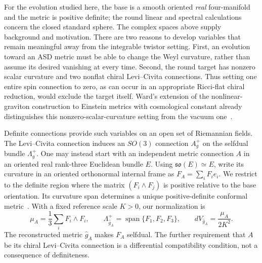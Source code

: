 \documentclass[11pt]{article}
\numberwithin{equation}{section}
\theoremstyle{definition}
\theoremstyle{remark}
\begin{document}
For the evolution studied here, the base is a smooth oriented \emph{real}
four-manifold and the metric is positive definite; the round linear and
spectral calculations concern the closed standard sphere. The complex spaces
above supply background and motivation. There are two reasons to develop
variables that remain meaningful away from the integrable twistor setting.
First, an evolution toward an ASD metric must be able to change the Weyl
curvature, rather than assume its desired vanishing at every time. Second,
the round target has nonzero scalar curvature and two nonflat chiral
Levi--Civita connections. Thus setting one entire spin connection to zero,
as can occur in an appropriate Ricci-flat chiral reduction, would exclude
the target itself. Ward's extension of the nonlinear-graviton construction
to Einstein metrics with cosmological constant already distinguishes this
nonzero-scalar-curvature setting from the vacuum one~\cite{Ward1980}.

Definite connections provide such variables on an open set of Riemannian
fields. The Levi--Civita connection induces an \(SO(3)\) connection
\(A_g^+\) on the selfdual bundle \(\Lambda_g^+\).
One may instead start with an independent metric connection \(A\) in an
oriented real rank-three Euclidean bundle \(E\). Using
\(\mathfrak{so}(E)\simeq E\), write its curvature in an oriented
orthonormal internal frame as \(F_A=\sum_iF_i e_i\). We restrict to the
definite region where the matrix \((F_i\wedge F_j)\) is positive relative
to the base orientation. Its curvature span determines a unique
positive-definite conformal metric~\cite{Fine2011}.
With a fixed reference scale \(K>0\), our normalization is
\begin{equation}\label{eq:intro-reconstruction}
 \mu_A=\frac13\sum_iF_i\wedge F_i,\qquad
 \Lambda^+_{\widehat g_A}=\operatorname{span}\{F_1,F_2,F_3\},\qquad
 dV_{\widehat g_A}=\frac{\mu_A}{2K^2}.
\end{equation}
The reconstructed metric \(\widehat g_A\) makes \(F_A\) selfdual.
The further requirement that \(A\) be its chiral Levi--Civita connection
is a differential compatibility condition, not a consequence of definiteness.
\end{document}
